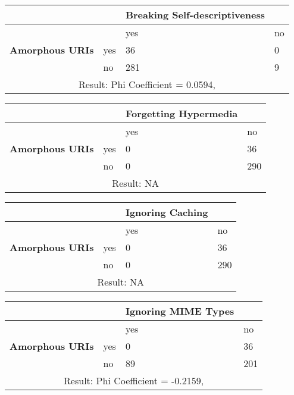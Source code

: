 \documentclass[a4paper,12pt]{article}
\begin{document}
\begin{center}
  \begin{tabular}{| p{60mm} | p{10mm} | p{35mm} | p{35mm} |}
  \hline
   & & \textbf{Breaking Self-descriptiveness} &
  \\
  \hline
  & & yes & no
  \\
  \hline
  \textbf{Amorphous URIs} & yes & 36 & 0
  \\
  \hline
   & no & 281 & 9
  \\
  \hline
  \multicolumn{4}{|c|}{Result: Phi Coefficient = 0.0594, }
  \\ \hline
  \end{tabular}
  \end{center}

\begin{center}
  \begin{tabular}{| p{60mm} | p{10mm} | p{35mm} | p{35mm} |}
  \hline
   & & \textbf{Forgetting Hypermedia} &
  \\
  \hline
  & & yes & no
  \\
  \hline
  \textbf{Amorphous URIs} & yes & 0 & 36
  \\
  \hline
   & no & 0 & 290
  \\
  \hline
  \multicolumn{4}{|c|}{Result: NA}
  \\ \hline
  \end{tabular}
  \end{center}

\begin{center}
  \begin{tabular}{| p{60mm} | p{10mm} | p{35mm} | p{35mm} |}
  \hline
   & & \textbf{Ignoring Caching} &
  \\
  \hline
  & & yes & no
  \\
  \hline
  \textbf{Amorphous URIs} & yes & 0 & 36
  \\
  \hline
   & no & 0 & 290
  \\
  \hline
  \multicolumn{4}{|c|}{Result: NA}
  \\ \hline
  \end{tabular}
  \end{center}

\begin{center}
  \begin{tabular}{| p{60mm} | p{10mm} | p{35mm} | p{35mm} |}
  \hline
   & & \textbf{Ignoring MIME Types} &
  \\
  \hline
  & & yes & no
  \\
  \hline
  \textbf{Amorphous URIs} & yes & 0 & 36
  \\
  \hline
   & no & 89 & 201
  \\
  \hline
  \multicolumn{4}{|c|}{Result: Phi Coefficient = -0.2159, }
  \\ \hline
  \end{tabular}
  \end{center}
\end{document}
